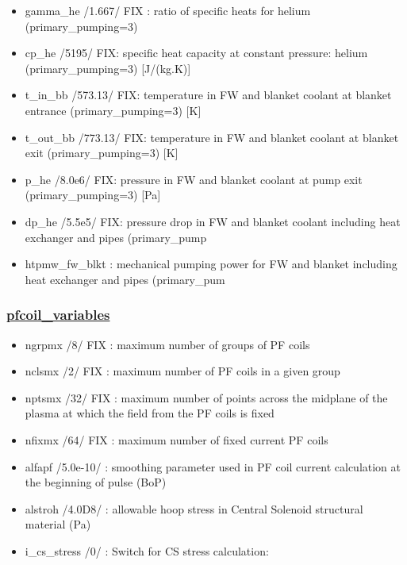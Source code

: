 \documentclass[
]{article}
\providecommand{\tightlist}{%
  \setlength{\itemsep}{0pt}\setlength{\parskip}{0pt}}
\begin{document}
\begin{itemize}
  \begin{itemize}
  \tightlist
  \item
    gamma\_he /1.667/ FIX : ratio of specific heats for helium
    (primary\_pumping=3)
  \item
    cp\_he /5195/ FIX: specific heat capacity at constant pressure:
    helium (primary\_pumping=3) {[}J/(kg.K){]}
  \item
    t\_in\_bb /573.13/ FIX: temperature in FW and blanket coolant at
    blanket entrance (primary\_pumping=3) {[}K{]}
  \item
    t\_out\_bb /773.13/ FIX: temperature in FW and blanket coolant at
    blanket exit (primary\_pumping=3) {[}K{]}
  \item
    p\_he /8.0e6/ FIX: pressure in FW and blanket coolant at pump exit
    (primary\_pumping=3) {[}Pa{]}
  \item
    dp\_he /5.5e5/ FIX: pressure drop in FW and blanket coolant
    including heat exchanger and pipes (primary\_pump
  \item
    htpmw\_fw\_blkt : mechanical pumping power for FW and blanket
    including heat exchanger and pipes (primary\_pum
  \end{itemize}

  \hypertarget{pfcoil_variables}{%
  \subsubsection{\texorpdfstring{\href{pfcoil_variables.html}{pfcoil\_variables}}{pfcoil\_variables}}\label{pfcoil_variables}}

  \begin{itemize}
  \tightlist
  \item
    ngrpmx /8/ FIX : maximum number of groups of PF coils
  \item
    nclsmx /2/ FIX : maximum number of PF coils in a given group
  \item
    nptsmx /32/ FIX : maximum number of points across the midplane of
    the plasma at which the field from the PF coils is fixed
  \item
    nfixmx /64/ FIX : maximum number of fixed current PF coils
  \item
    alfapf /5.0e-10/ : smoothing parameter used in PF coil current
    calculation at the beginning of pulse (BoP)
  \item
    alstroh /4.0D8/ : allowable hoop stress in Central Solenoid
    structural material (Pa)
  \item
    i\_cs\_stress /0/ : Switch for CS stress calculation:


\end{itemize}
\end{itemize}
\end{document}
